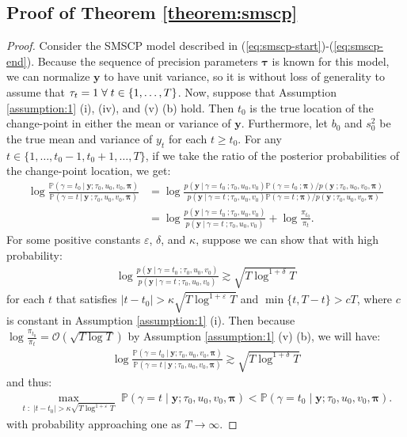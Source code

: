 \subsection{Proof of Theorem \ref{theorem:smscp}}
\label{app:localization-smscp}

\begin{proof}
Consider the SMSCP model described in (\ref{eq:smscp-start})-(\ref{eq:smscp-end}). Because the sequence of precision parameters $\pmb{\tau}$ is known for this model, we can normalize $\mathbf{y}$ to have unit variance, so it is without loss of generality to assume that $\tau_t = 1 \;\forall\; t \in \{1,\ldots,T\}$. Now, suppose that Assumption \ref{assumption:1} (i), (iv), and (v) (b) hold. Then $t_0$ is the true location of the change-point in either the mean or variance of $\mathbf{y}$. Furthermore, let $b_0$ and $s_0^2$ be the true mean and variance of $y_t$ for each $t \geq t_0$. For any $t \in \{1,\ldots, t_0-1,t_0+1, \ldots,T\}$, if we take the ratio of the posterior probabilities of the change-point location, we get:
\begin{align*}
    \log \frac{\mathbb{P}(\gamma = t_0  \:|\: \mathbf{y} ; \tau_0, u_0, v_0,\pmb{\pi})}{\mathbb{P}(\gamma = t  \:|\: \mathbf{y} \:; \tau_0, u_0, v_0,\pmb{\pi})} &=  \log \frac{p(\mathbf{y} \:|\:\gamma = t_0 \:; \tau_0, u_0, v_0)\mathbb{P}(\gamma = t_0 \:; \pmb{\pi})/ p(\mathbf{y}\:;\tau_0, u_0, v_0,\pmb{\pi})}{p(\mathbf{y} \:|\:\gamma = t \:; \tau_0, u_0, v_0)\mathbb{P}(\gamma = t \:;\pmb{\pi})/ p(\mathbf{y}\:;\tau_0, u_0, v_0,\pmb{\pi})} \tag{Bayes' rule} \\
    &= \log \frac{p(\mathbf{y} \:|\:\gamma = t_0 \:; \tau_0, u_0, v_0)}{p(\mathbf{y} \:|\:\gamma = t \:; \tau_0, u_0, v_0)} + \log\frac{\pi_{t_0}}{\pi_t}.
\end{align*}
For some positive constants $\varepsilon$, $\delta$, and $\kappa$, suppose we can show that with high probability:
\begin{align}
    \log \frac{p(\mathbf{y} \:|\:\gamma = t_0 \:; \tau_0, u_0, v_0)}{p(\mathbf{y} \:|\:\gamma = t \:; \tau_0,  u_0, v_0)} \gtrsim \sqrt{T \log^{1+\delta} T} \label{eq:thm3-result}
\end{align}
for each $t$ that satisfies $|t-t_0| >\kappa \sqrt{T\log^{1+\varepsilon}T}$ and  $\min\{t,T-t\} > cT$, where $c$ is constant in Assumption \ref{assumption:1} (i). Then because $\log \frac{\pi_{t_0}}{\pi_t} = \mathcal{O}(\sqrt{T\log T})$ by Assumption \ref{assumption:1} (v) (b), we will have:
\begin{align*}
    \log \frac{\mathbb{P}(\gamma = t_0  \:|\: \mathbf{y} ; \tau_0, u_0, v_0,\pmb{\pi})}{\mathbb{P}(\gamma = t  \:|\: \mathbf{y} \:; \tau_0, u_0, v_0,\pmb{\pi})} \gtrsim \sqrt{T\log^{1+\delta}T}
\end{align*}
and thus:
\begin{align*}
    \max_{t \;:\; |t - t_0| > \kappa \sqrt{T\log^{1+\varepsilon} T}} \; \mathbb{P}(\gamma = t  \;|\; \mathbf{y} ; \tau_0, u_0, v_0,\pmb{\pi}) < \mathbb{P}(\gamma = t_0  \;|\; \mathbf{y} ; \tau_0, u_0, v_0,\pmb{\pi}).
\end{align*}
with probability approaching one as $T \to \infty$. 


\end{proof}
